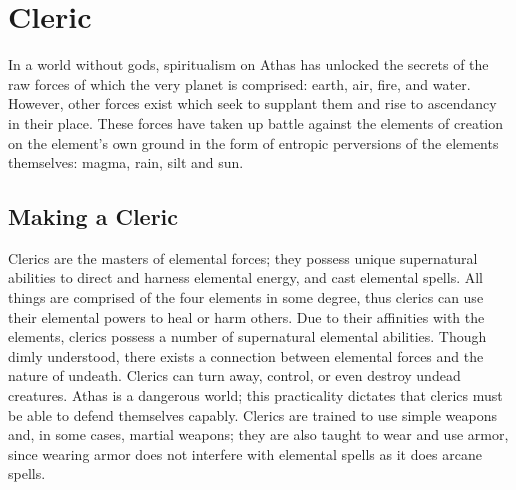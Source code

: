 \section{Cleric}

In a world without gods, spiritualism on Athas has unlocked the secrets of the raw forces of which the very planet is comprised: earth, air, fire, and water. However, other forces exist which seek to supplant them and rise to ascendancy in their place. These forces have taken up battle against the elements of creation on the element's own ground in the form of entropic perversions of the elements themselves: magma, rain, silt and sun.

\subsection{Making a Cleric}

Clerics are the masters of elemental forces; they possess unique supernatural abilities to direct and harness elemental energy, and cast elemental spells. All things are comprised of the four elements in some degree, thus clerics can use their elemental powers to heal or harm others. Due to their affinities with the elements, clerics possess a number of supernatural elemental abilities. Though dimly understood, there exists a connection between elemental forces and the nature of undeath. Clerics can turn away, control, or even destroy undead creatures. Athas is a dangerous world; this practicality dictates that clerics must be able to defend themselves capably. Clerics are trained to use simple weapons and, in some cases, martial weapons; they are also taught to wear and use armor, since wearing armor does not interfere with elemental spells as it does arcane spells.

